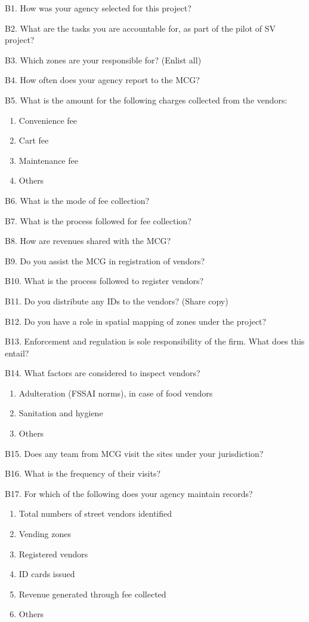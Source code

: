 \documentclass[a4paper, 12pt, twoside]{article}
\begin{document}
{{\begin{mdframed}[backgroundcolor=gray!20]
B1. How was your agency selected for this project?

B2. What are the tasks you are accountable for, as part of the pilot of SV project?

B3. Which zones are your responsible for? (Enlist all)

B4. How often does your agency report to the MCG?

B5. What is the amount for the following charges collected from the vendors:
\begin{enumerate}
\item Convenience fee
\item Cart fee
\item Maintenance fee
\item Others
\end{enumerate}

B6.  What is the mode of fee collection?

B7. What is the process followed for fee collection?

B8. How are revenues shared with the MCG?

B9. Do you assist the MCG in registration of vendors?

B10. What is the process followed to register vendors?

B11. Do you distribute any IDs to the vendors? (Share copy)

B12. Do you have a role in spatial mapping of zones under the project?

B13. Enforcement and regulation is sole responsibility of the firm. What does this entail?

B14. What factors are considered to inspect vendors?
\begin{enumerate}
\item Adulteration (FSSAI norms), in case of food vendors
\item Sanitation and hygiene
\item Others
\end{enumerate}

B15. Does any team from MCG visit the sites under your jurisdiction?

B16. What is the frequency of their visits?

B17.  For which of the following does your agency maintain records?
\begin{enumerate}
\item Total numbers of street vendors identified
\item Vending zones
\item Registered vendors
\item ID cards issued
\item Revenue generated through fee collected
\item Others
\end{enumerate}


\end{mdframed}}}
\end{document}
